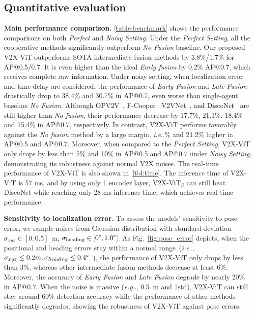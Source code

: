 \documentclass[runningheads]{llncs}
\makeatletter
\DeclareRobustCommand\onedot{\futurelet\@let@token\@onedot}
\def\@onedot{\ifx\@let@token.\else.\null\fi\xspace}
\def\eg{\emph{e.g}\onedot} \def\Eg{\emph{E.g}\onedot}
\def\ie{\emph{i.e}\onedot} \def\Ie{\emph{I.e}\onedot}
\makeatother
\begin{document}
\subsection{Quantitative evaluation}
\noindent\textbf{Main performance comparison.}
\cref{table:benchmark} shows the performance comparisons on both \textit{Perfect} and \textit{Noisy Setting}. 
Under the \textit{Perfect Setting}, all the cooperative methods significantly outperform \textit{No Fusion} baseline. Our proposed V2X-ViT outperforms SOTA intermediate fusion methods by 3.8\%/1.7\% for AP@0.5/0.7. It
is even higher than the ideal \textit{Early fusion} by 0.2\% AP@0.7, which receives complete raw information. Under noisy setting, when localization error and time delay are considered, the performance of \textit{Early Fusion} and \textit{Late Fusion} drastically drop to 38.4\% and 30.7\% in AP@0.7, even worse than single-agent baseline \textit{No Fusion}. Although OPV2V~\cite{xu2021opv2v}, F-Cooper~\cite{chen2019f} V2VNet~\cite{wang2020v2vnet}, and DiscoNet~\cite{li2021learning} are still higher than \textit{No fusion}, their performance decrease by 17.7\%, 21.1\%, 18.4\% and 15.4\% in AP@0.7, respectively. In contrast, V2X-ViT performs favorably against the \textit{No fusion} method by a large margin, \ie 23\% and 21.2\% higher in AP@0.5 and AP@0.7. Moreover, when compared to the \textit{Perfect Setting}, V2X-ViT only drops by less than 5\% and 10\% in AP@0.5 and AP@0.7 under \textit{Noisy Setting}, demonstrating its robustness against normal V2X noises. The real-time performance of V2X-ViT is also shown in~\cref{tbl:time}. The inference time of V2X-ViT is 57 ms, and by using only 1 encoder layer, V2X-ViT${}_S$ can still beat DiscoNet while reaching only 28 ms inference time, which achieves real-time performance.

\noindent\textbf{Sensitivity to localization error.}
To assess the models' sensitivity to pose error, we sample noises from Gaussian distribution with standard deviation $\sigma_{xyz}\in[0, 0.5]$~m, $\sigma_\mathrm{heading}\in[0\degree, 1.0\degree$].
As Fig.~\ref{fig:pose_error} depicts, when the positional and heading errors stay within a normal range~(\ie, $\sigma_{xyz} \leq 0.2m, \sigma_{heading} \leq 0.4\degree$~\cite{RT3000,li2020toward,xia2021advancing}), the performance of V2X-ViT only drops by less than 3\%, whereas other intermediate fusion methods decrease at least 6\%. Moreover, the accuracy of \textit{Early Fusion} and \textit{Late Fusion} degrade by nearly 20\% in AP@0.7. When the noise is massive (\eg, 0.5~m and 1\degree std), V2X-ViT can still stay around 60\% detection accuracy while the performance of other methods significantly degrades, showing the robustness of V2X-ViT against pose errors.
\end{document}
